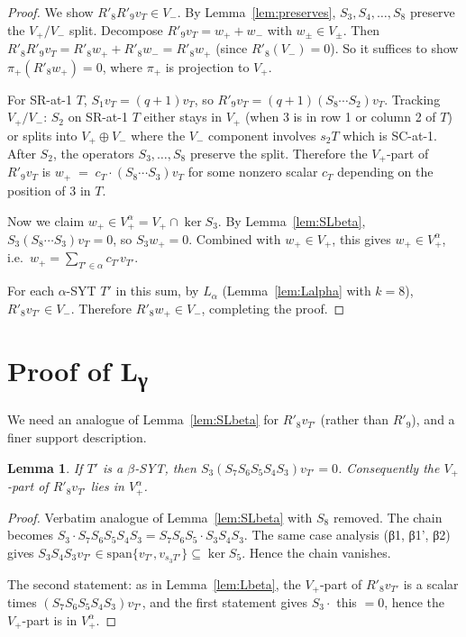 \documentclass[11pt]{article}
\newtheorem{lemma}{Lemma}
\newcommand{\Vp}{V_{+}}
\newcommand{\Vm}{V_{-}}
\newcommand{\Vpalpha}{V_{+}^{\alpha}}
\begin{document}
\begin{proof}
We show $R'_8 R'_9 v_T \in \Vm$. By Lemma~\ref{lem:preserves}, $S_3, S_4, \ldots, S_8$ preserve
the $\Vp/\Vm$ split. Decompose $R'_9 v_T = w_+ + w_-$ with $w_\pm \in V_\pm$. Then
$R'_8 R'_9 v_T = R'_8 w_+ + R'_8 w_- = R'_8 w_+$ (since $R'_8(\Vm) = 0$).
So it suffices to show $\pi_+(R'_8 w_+) = 0$, where $\pi_+$ is projection to $\Vp$.

For SR-at-1 $T$, $S_1 v_T = (q+1) v_T$, so $R'_9 v_T = (q+1)(S_8 \cdots S_2) v_T$.
Tracking $\Vp/\Vm$: $S_2$ on SR-at-1 $T$ either stays in $\Vp$ (when 3 is in row 1
or column 2 of $T$) or splits into $\Vp \oplus \Vm$ where the $\Vm$ component
involves $s_2 T$ which is SC-at-1. After $S_2$, the operators $S_3, \ldots, S_8$
preserve the split. Therefore the $\Vp$-part of $R'_9 v_T$ is
$
w_+ \;=\; c_T \cdot (S_8 \cdots S_3) v_T
$
for some nonzero scalar $c_T$ depending on the position of 3 in $T$.

Now we claim $w_+ \in \Vpalpha = \Vp \cap \ker S_3$. By Lemma~\ref{lem:SLbeta},
$S_3 (S_8 \cdots S_3) v_T = 0$, so $S_3 w_+ = 0$. Combined with $w_+ \in \Vp$,
this gives $w_+ \in \Vpalpha$, i.e.\ $w_+ = \sum_{T' \in \alpha} c_{T'} v_{T'}$.

For each $\alpha$-SYT $T'$ in this sum, by $L_\alpha$ (Lemma~\ref{lem:Lalpha} with
$k=8$), $R'_8 v_{T'} \in \Vm$. Therefore $R'_8 w_+ \in \Vm$, completing the proof.
\end{proof}

\section{Proof of L\textsubscript{γ}}

We need an analogue of Lemma~\ref{lem:SLbeta} for $R'_8 v_{T'}$ (rather than
$R'_9$), and a finer support description.

\begin{lemma} \label{lem:SLbeta-R8}
If $T'$ is a $\beta$-SYT, then $S_3 (S_7 S_6 S_5 S_4 S_3) v_{T'} = 0$. Consequently
the $\Vp$-part of $R'_8 v_{T'}$ lies in $\Vpalpha$.
\end{lemma}

\begin{proof}
Verbatim analogue of Lemma~\ref{lem:SLbeta} with $S_8$ removed. The chain becomes
$S_3 \cdot S_7 S_6 S_5 S_4 S_3 = S_7 S_6 S_5 \cdot S_3 S_4 S_3$. The same case
analysis (β1, β1', β2) gives $S_3 S_4 S_3 v_{T'} \in \mathrm{span}\{v_{T'}, v_{s_3 T'}\}
\subseteq \ker S_5$. Hence the chain vanishes.

The second statement: as in Lemma~\ref{lem:Lbeta}, the $\Vp$-part of $R'_8 v_{T'}$
is a scalar times $(S_7 S_6 S_5 S_4 S_3) v_{T'}$, and the first statement gives
$S_3 \cdot$ this $= 0$, hence the $\Vp$-part is in $\Vpalpha$.
\end{proof}
\end{document}
